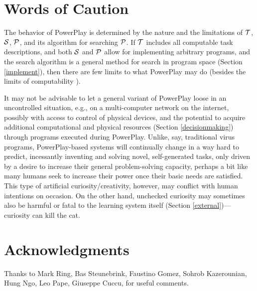 \documentclass{article}
\begin{document}
\section{Words of Caution}
\label{caution}

The behavior of {\sc PowerPlay} is determined by the nature and the limitations of $\cal T$, $\cal S$, $\cal P$, 
and its algorithm for searching $\cal P$. If $\cal T$ includes all computable task descriptions,
and both $\cal S$ and $\cal P$ allow for implementing arbitrary
programs, and the search algorithm is a general method for search in program space (Section \ref{implement}),
then there are few limits  to what {\sc PowerPlay} may do (besides the limits of computability \cite{Goedel:31}).

It may not be advisable to let a general variant of {\sc PowerPlay} loose in an 
uncontrolled situation, e.g., on a multi-computer network on the internet, 
possibly with access to control of physical devices, and the potential to
acquire additional computational and physical resources (Section \ref{decisionmaking})
 through programs executed during {\sc PowerPlay}.
Unlike, say, traditional virus programs, {\sc PowerPlay}-based systems will continually change  in a way 
hard to predict, incessantly inventing and solving novel, self-generated 
tasks, only driven by a desire to increase their general problem-solving capacity,
perhaps a bit like many humans seek to increase their power once their basic needs are satisfied.
This type of artificial curiosity/creativity, however, may conflict with human intentions on occasion.
On the other hand, unchecked curiosity may sometimes also be harmful or fatal 
to the learning system itself (Section \ref{external})---curiosity can kill the cat. 


\section{Acknowledgments}
\label{ack}
Thanks to Mark Ring, 
Bas Steunebrink, Faustino Gomez, Sohrob Kazerounian, Hung Ngo, Leo Pape, Giuseppe Cuccu, for useful comments. 




%
%
\end{document}

